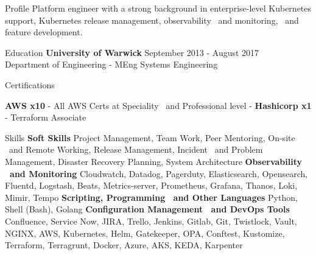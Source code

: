 \documentclass{resume} %
\begin{document}

\begin{rSection}{Profile}
\smallbreak
\normalfont Platform engineer with a strong background in enterprise-level Kubernetes support, Kubernetes release management, observability \ and  monitoring, \ and  feature development. \newline
\end{rSection}


\begin{rSection}{Education}
\smallbreak
{\bf University of Warwick} \hfill { September 2013 - August 2017}
\\ \normalfont Department of Engineering - MEng Systems Engineering
\end{rSection}


\begin{rSection}{Certifications}
\item \textbf{AWS x10} - \normalfont All AWS Certs at Speciality \ and  Professional level - \textbf{Hashicorp x1} - \normalfont Terraform Associate
\end{rSection}


\begin{rSection}{Skills}
\smallbreak
{\bf Soft Skills} \newline
Project Management, Team Work, Peer Mentoring, On-site \ and  Remote Working, Release Management, Incident \ and  Problem Management, Disaster Recovery Planning, System Architecture \newline
{\bf Observability \ and  Monitoring} \newline
Cloudwatch, Datadog, Pagerduty, Elasticsearch, Opensearch, Fluentd, Logstash, Beats, Metrics-server, Prometheus, Grafana, Thanos, Loki, Mimir, Tempo \newline
{\bf Scripting, Programming \ and  Other Languages} \newline
Python, Shell (Bash), Golang \newline
{\bf Configuration Management \ and  DevOps Tools} \newline
Confluence, Service Now, JIRA, Trello, Jenkins, Gitlab, Git, Twistlock, Vault, NGINX, AWS, Kubernetes, Helm, Gatekeeper, OPA, Conftest, Kustomize, Terraform, Terragrunt, Docker, Azure, AKS, KEDA, Karpenter
\end{rSection}
\end{document}
